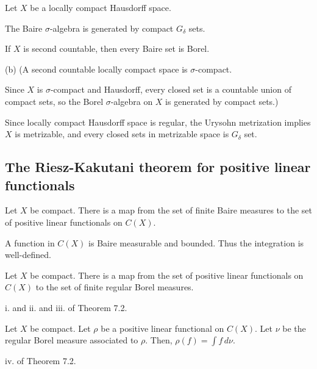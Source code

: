 \documentclass{../note}
\begin{document}
\begin{prb}
Let $X$ be a locally compact Hausdorff space.
\begin{parts}
\item The Baire $\sigma$-algebra is generated by compact $G_\delta$ sets.
\item If $X$ is second countable, then every Baire set is Borel.
\end{parts}
\end{prb}
\begin{sol}
(b)
(A second countable locally compact space is $\sigma$-compact.

Since $X$ is $\sigma$-compact and Hausdorff, every closed set is a countable union of compact sets, so the Borel $\sigma$-algebra on $X$ is generated by compact sets.)

Since locally compact Hausdorff space is regular, the Urysohn metrization implies $X$ is metrizable, and every closed sets in metrizable space is $G_\delta$ set.
\end{sol}

\subsection{The Riesz-Kakutani theorem for positive linear functionals}
\begin{prb}
Let $X$ be compact.
There is a map from the set of finite Baire measures to the set of positive linear functionals on $C(X)$.
\end{prb}
\begin{sol}
A function in $C(X)$ is Baire measurable and bounded.
Thus the integration is well-defined.
\end{sol}

\begin{prb}
Let $X$ be compact.
There is a map from the set of positive linear functionals on $C(X)$ to the set of finite regular Borel measures.
\end{prb}
\begin{sol}
i. and ii. and iii. of Theorem 7.2.
\end{sol}


\begin{prb}
Let $X$ be compact.
Let $\rho$ be a positive linear functional on $C(X)$.
Let $\nu$ be the regular Borel measure associated to $\rho$.
Then, $\rho(f)=\int f\,d\nu$.
\end{prb}
\begin{sol}
iv. of Theorem 7.2.
\end{sol}
\end{document}
